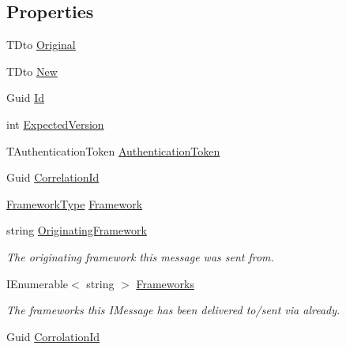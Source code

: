 \subsection*{Properties}
\begin{DoxyCompactItemize}
\item 
T\+Dto \hyperlink{classCqrs_1_1Commands_1_1DtoCommand_a67471c7e64228ee832343be7b89aa708}{Original}
\item 
T\+Dto \hyperlink{classCqrs_1_1Commands_1_1DtoCommand_a9664c5705a6de37478bdb627590363e5}{New}
\item 
Guid \hyperlink{classCqrs_1_1Commands_1_1DtoCommand_a14212f77b9341f240f77efa6d6adf211}{Id}
\item 
int \hyperlink{classCqrs_1_1Commands_1_1DtoCommand_a9429ca1b2c6576c36d46912a18e5dc18}{Expected\+Version}
\item 
T\+Authentication\+Token \hyperlink{classCqrs_1_1Commands_1_1DtoCommand_aedf535bfbf04e3532c90e69548b85c32}{Authentication\+Token}
\item 
Guid \hyperlink{classCqrs_1_1Commands_1_1DtoCommand_aeb60eb40f2a201fd63e846d728768cdf}{Correlation\+Id}
\item 
\hyperlink{namespaceCqrs_1_1Messages_af06a7e6cd2609043d0f2f5f3419f81e3}{Framework\+Type} \hyperlink{classCqrs_1_1Commands_1_1DtoCommand_aef8db1c8e62c27c09abd1590f05bfba1}{Framework}
\item 
string \hyperlink{classCqrs_1_1Commands_1_1DtoCommand_a7272fbc4acb35942a1c5fb22cd3a6b9b}{Originating\+Framework}
\begin{DoxyCompactList}\small\item\em The originating framework this message was sent from. \end{DoxyCompactList}\item 
I\+Enumerable$<$ string $>$ \hyperlink{classCqrs_1_1Commands_1_1DtoCommand_a2df20833afc756e5f7d553e4ed28406e}{Frameworks}
\begin{DoxyCompactList}\small\item\em The frameworks this I\+Message has been delivered to/sent via already. \end{DoxyCompactList}\item 
Guid \hyperlink{classCqrs_1_1Commands_1_1DtoCommand_a993ec84328a24072852d52fb8751114f}{Corrolation\+Id}
\end{DoxyCompactItemize}


